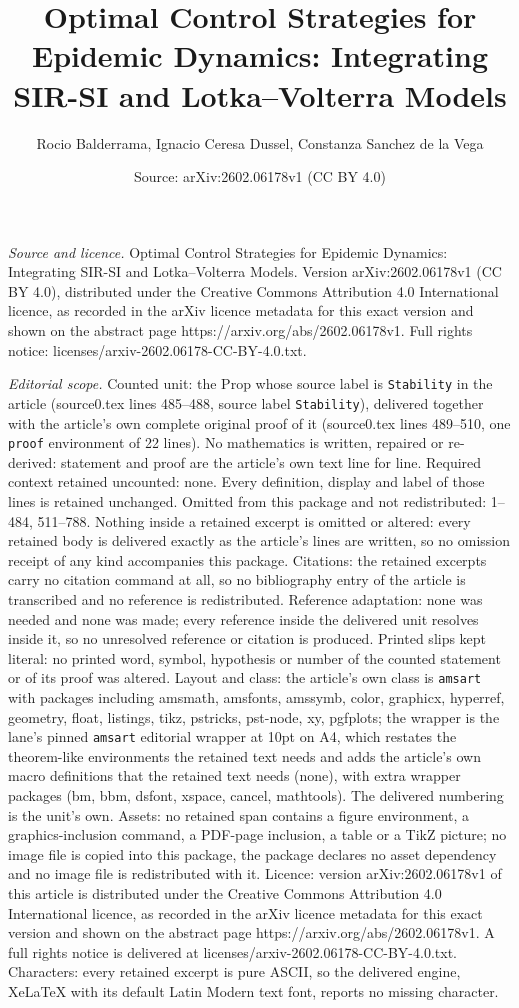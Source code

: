 \documentclass[10pt,a4paper]{amsart}
\title[Optimal Control Strategies for Epidemic Dynamics: Integratin]{Optimal Control Strategies for Epidemic Dynamics: Integrating SIR-SI and Lotka--Volterra Models}
\author{Rocio Balderrama, Ignacio Ceresa Dussel, Constanza Sanchez de la Vega}
\date{Source: arXiv:2602.06178v1 (CC BY 4.0)}
\begin{document}
\maketitle

\noindent\emph{Source and licence.} Optimal Control Strategies for Epidemic Dynamics: Integrating SIR-SI and Lotka--Volterra Models. Version arXiv:2602.06178v1 (CC BY 4.0), distributed under the Creative Commons Attribution 4.0 International licence, as recorded in the arXiv licence metadata for this exact version and shown on the abstract page https://arxiv.org/abs/2602.06178v1. Full rights notice: licenses/arxiv-2602.06178-CC-BY-4.0.txt.\par\smallskip

\noindent\textit{Editorial scope.} Counted unit: the Prop whose source label is \texttt{Stability} in the article (source0.tex lines 485--488, source label \texttt{Stability}), delivered together with the article's own complete original proof of it (source0.tex lines 489--510, one \texttt{proof} environment of 22 lines). No mathematics is written, repaired or re-derived: statement and proof are the article's own text line for line. Required context retained uncounted: none. Every definition, display and label of those lines is retained unchanged. Omitted from this package and not redistributed: 1--484, 511--788. Nothing inside a retained excerpt is omitted or altered: every retained body is delivered exactly as the article's lines are written, so no omission receipt of any kind accompanies this package. Citations: the retained excerpts carry no citation command at all, so no bibliography entry of the article is transcribed and no reference is redistributed. Reference adaptation: none was needed and none was made; every reference inside the delivered unit resolves inside it, so no unresolved reference or citation is produced. Printed slips kept literal: no printed word, symbol, hypothesis or number of the counted statement or of its proof was altered. Layout and class: the article's own class is \texttt{amsart} with packages including amsmath, amsfonts, amssymb, color, graphicx, hyperref, geometry, float, listings, tikz, pstricks, pst-node, xy, pgfplots; the wrapper is the lane's pinned \texttt{amsart} editorial wrapper at 10pt on A4, which restates the theorem-like environments the retained text needs and adds the article's own macro definitions that the retained text needs (none), with extra wrapper packages (bm, bbm, dsfont, xspace, cancel, mathtools). The delivered numbering is the unit's own. Assets: no retained span contains a figure environment, a graphics-inclusion command, a PDF-page inclusion, a table or a TikZ picture; no image file is copied into this package, the package declares no asset dependency and no image file is redistributed with it. Licence: version arXiv:2602.06178v1 of this article is distributed under the Creative Commons Attribution 4.0 International licence, as recorded in the arXiv licence metadata for this exact version and shown on the abstract page https://arxiv.org/abs/2602.06178v1. A full rights notice is delivered at licenses/arxiv-2602.06178-CC-BY-4.0.txt. Characters: every retained excerpt is pure ASCII, so the delivered engine, XeLaTeX with its default Latin Modern text font, reports no missing character.
\end{document}

